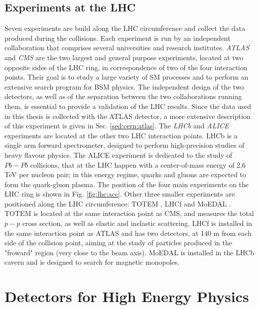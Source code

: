 \subsection{Experiments at the LHC}

Seven experiments are build along the LHC circumference and collect the data produced during the collisions. Each experiment is run by an independent collaboration that comprises several universities and research institutes. 
\textit{ATLAS} \cite{atlas:atlas} and \textit{CMS} \cite{cms:cms} are the two largest and general purpose experiments, located at two opposite sides of the LHC ring, in correspondence of two of the four interaction points. Their goal is to study a large variety of SM processes and to perform an extensive search program for BSM physics. The independent design of the two detectors, as well as of the separation between the two collaborations running them, is essential to provide a validation of the LHC results. Since the data used in this thesis is collected with the ATLAS detector, a more extensive description of this experiment is given in Sec. \ref{sed:cern:atlas}. 
The \textit{LHCb} \cite{lhcb:lhcb} and \textit{ALICE} \cite{alice:alice} experiments are located at the other two LHC interaction points. LHCb is a single arm forward spectrometer, designed to perform high-precision studies of heavy flavour physics. The ALICE experiment is dedicated to the study of $Pb-Pb$ collisions, that at the LHC happen with a center-of-mass energy of 2.6 TeV per nucleon pair; in this energy regime, quarks and gluons are expected to form the quark-gluon plasma.
The position of the four main experiments on the LHC ring is shown in Fig. \ref{fig:lhc:acc}.
Other three smaller experiments are positioned along the LHC circumference: TOTEM \cite{totem:totem}, LHCf \cite{lhcf:lhcf} and MoEDAL \cite{moedal:moedal}. TOTEM is located at the same interaction point as CMS, and measures the total $p-p$ cross section, as well as elastic and inelastic scattering. LHCf is installed in the same interaction point as ATLAS and has two detectors, at 140 m from each side of the collision point, aiming at the study of particles produced in the "froward" region (very close to the beam axis). MoEDAL is installed in the LHCb cavern and is designed to search for magnetic monopoles.  



\section{Detectors for High Energy Physics}
\label{sec:detectors}

